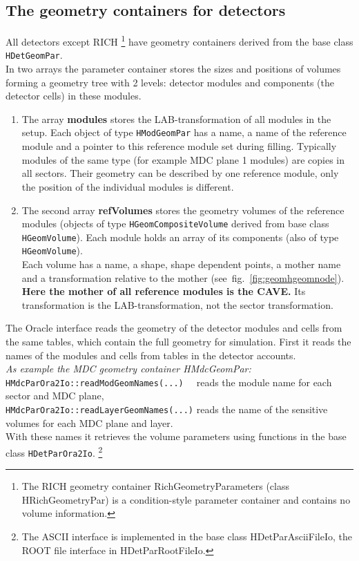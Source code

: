 \subsection[The geometry containers for detectors]{The geometry containers for detectors}

All detectors except RICH
\footnote{The RICH geometry container RichGeometryParameters (class HRichGeometryPar) is a condition-style parameter 
container and contains no volume information.} have geometry containers derived from the base class \verb+HDetGeomPar+.\\ 
In two arrays the parameter container stores the sizes and positions of volumes forming a geometry tree with 2 levels: 
detector modules and components (the detector cells) in these modules.
\begin{enumerate}
  \item The array \textbf{modules} stores the LAB-transformation of all modules in the setup.
    Each object of type \verb+HModGeomPar+ has a name, a name of the reference module and a pointer to this reference 
    module set during filling. Typically modules of the same type (for example MDC plane 1 modules) are copies in all 
    sectors. Their geometry can be described by one reference module, only the position of the individual modules is 
    different.
 \item The second array \textbf{refVolumes} stores the geometry volumes of the reference modules (objects of type 
    \verb+HGeomCompositeVolume+ derived from base class \verb+HGeomVolume+). Each module holds an array of its components
    (also of type \verb+HGeomVolume+).\\
    Each volume has a name, a shape, shape dependent points, a mother name and a transformation relative to the 
    mother (see~fig.~\ref{fig:geomhgeomnode}).\\
    \textbf{Here the mother of all reference modules is the CAVE.} Its transformation is the LAB-transformation, not the 
    sector transformation.
\end{enumerate}

The Oracle interface reads the geometry of the detector modules and cells from the same tables, which contain the full 
geometry for simulation. First it reads the names of the modules and cells from tables in the detector accounts.\\
\emph{As example the MDC geometry container HMdcGeomPar:}\\
\verb+HMdcParOra2Io::readModGeomNames(...)  + reads the module name for each sector and MDC plane,\\ 
\verb+HMdcParOra2Io::readLayerGeomNames(...)+ reads the name of the sensitive volumes for each MDC plane and layer.\\
With these names it retrieves the volume parameters using functions in the base class \verb+HDetParOra2Io+.
\footnote{The ASCII interface is implemented in the base class HDetParAsciiFileIo, the ROOT file interface in
HDetParRootFileIo.}\\

